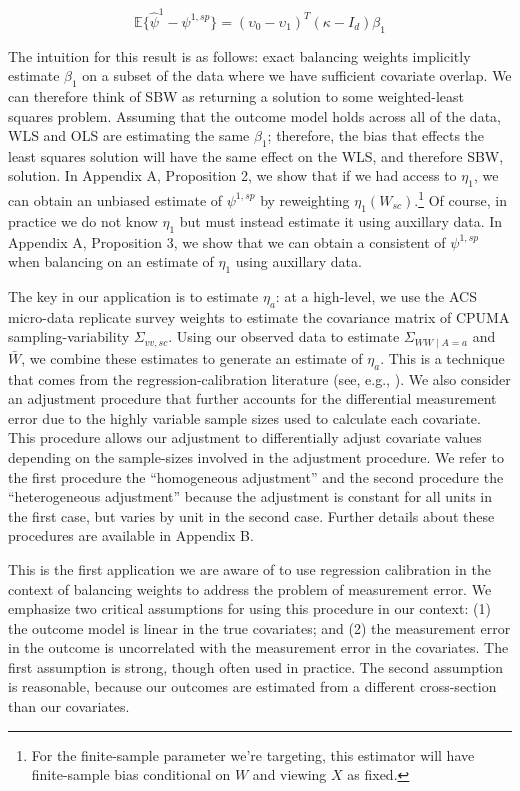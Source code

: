 \begin{equation}
\mathbb{E}\{\hat{\psi}^{1} - \psi^{1, sp}\} = (\upsilon_0 - \upsilon_1)^T(\kappa - I_d)\beta_1
\end{equation}

The intuition for this result is as follows: exact balancing weights implicitly estimate $\beta_1$ on a subset of the data where we have sufficient covariate overlap. We can therefore think of SBW as returning a solution to some weighted-least squares problem. Assuming that the outcome model holds across all of the data, WLS and OLS are estimating the same $\beta_1$; therefore, the bias that effects the least squares solution will have the same effect on the WLS, and therefore SBW, solution. In Appendix A, Proposition 2, we show that if we had access to $\eta_1$, we can obtain an unbiased estimate of $\psi^{1, sp}$ by reweighting $\eta_1(W_{sc})$.\footnote{For the finite-sample parameter we're targeting, this estimator will have finite-sample bias conditional on $W$ and viewing $X$ as fixed.} Of course, in practice we do not know $\eta_1$ but must instead estimate it using auxillary data. In Appendix A, Proposition 3, we show that we can obtain a consistent of $\psi^{1, sp}$ when balancing on an estimate of $\eta_1$ using auxillary data. 

The key in our application is to estimate $\eta_a$: at a high-level, we use the ACS micro-data replicate survey weights to estimate the covariance matrix of CPUMA sampling-variability $\Sigma_{vv, sc}$. Using our observed data to estimate $\Sigma_{WW \mid A = a}$ and $\bar{W}$, we combine these estimates to generate an estimate of $\eta_a$. This is a technique that comes from the regression-calibration literature (see, e.g., \cite{gleser1992importance}). We also consider an adjustment procedure that further accounts for the differential measurement error due to the highly variable sample sizes used to calculate each covariate. This procedure allows our adjustment to differentially adjust covariate values depending on the sample-sizes involved in the adjustment procedure. We refer to the first procedure the ``homogeneous adjustment'' and the second procedure the ``heterogeneous adjustment'' because the adjustment is constant for all units in the first case, but varies by unit in the second case. Further details about these procedures are available in Appendix B.

This is the first application we are aware of to use regression calibration in the context of balancing weights to address the problem of measurement error. We emphasize two critical assumptions for using this procedure in our context: (1) the outcome model is linear in the true covariates; and (2) the measurement error in the outcome is uncorrelated with the measurement error in the covariates. The first assumption is strong, though often used in practice. The second assumption is reasonable, because our outcomes are estimated from a different cross-section than our covariates. 

